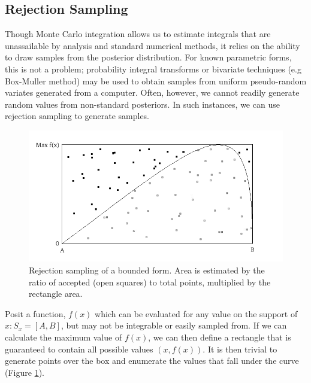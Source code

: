 
\hypertarget{rejection-sampling}{}
\subsection*{Rejection Sampling}

Though Monte Carlo integration allows us to estimate integrals that are unassailable by analysis and standard numerical methods, it relies on the ability to draw samples from the posterior distribution. For known parametric forms, this is not a problem; probability integral transforms or bivariate techniques (e.g Box-Muller method) may be used to obtain samples from uniform pseudo-random variates generated from a computer. Often, however, we cannot readily generate random values from non-standard posteriors. In such instances, we can use rejection sampling to generate samples.

\begin{figure}[ht]
        \begin{center}
        \includegraphics[scale=0.4]{reject.png}
    \end{center}
    \caption{Rejection sampling of a bounded form. Area is estimated by the ratio of accepted (open squares) to total points, multiplied by the rectangle area.}
    \label{fig:bound}
\end{figure}

Posit a function, $f(x)$ which can be evaluated for any value on the support of $x:S_x = [A,B]$, but may not be integrable or easily sampled from. If we can calculate the maximum  value of $f(x)$, we can then define a rectangle that is guaranteed to contain all possible values $(x,f(x))$. It is then trivial to generate points over the box and enumerate the values that fall under the curve (Figure \ref{fig:bound}).

